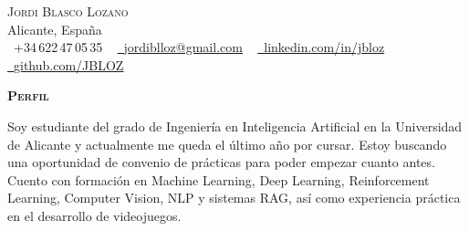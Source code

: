 \documentclass[letterpaper,11pt]{article}
\begin{document}
\begin{center}
    {\Huge \scshape Jordi Blasco Lozano} \\ \vspace{1pt}
    Alicante, Espa\~na \\ \vspace{1pt}
    \small \raisebox{-0.1\height}\faPhone\ +34\,622\,47\,05\,35 ~
    \href{mailto:jordiblloz@gmail.com}{\raisebox{-0.2\height}\faEnvelope\ \underline{jordiblloz@gmail.com}} ~
    \href{https://linkedin.com/in/jbloz}{\raisebox{-0.2\height}\faLinkedin\ \underline{linkedin.com/in/jbloz}} ~
    \href{https://github.com/JBLOZ}{\raisebox{-0.2\height}\faGithub\ \underline{github.com/JBLOZ}}
\end{center}

\vspace{4pt}
{\scshape\large\bfseries Perfil}\par
\vspace{2pt}
\small Soy estudiante del grado de Ingeniería en Inteligencia Artificial en la Universidad de Alicante y actualmente me queda el último año por cursar. Estoy buscando una oportunidad de convenio de prácticas para poder empezar cuanto antes. Cuento con formación en Machine Learning, Deep Learning, Reinforcement Learning, Computer Vision, NLP y sistemas RAG, así como experiencia práctica en el desarrollo de videojuegos.
\vspace{6pt}
\end{document}
